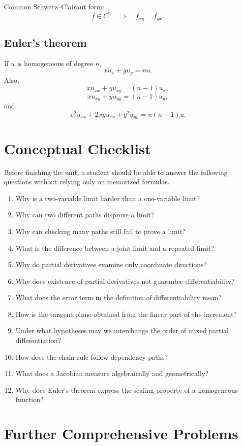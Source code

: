 \documentclass[11pt,oneside]{book}
\theoremstyle{studentthm}
\theoremstyle{definition}
\begin{document}
Common Schwarz--Clairaut form:
\[
f\in C^2
\quad\Longrightarrow\quad
f_{xy}=f_{yx}.
\]

\subsection*{Euler's theorem}
If \(u\) is homogeneous of degree \(n\),
\[
xu_x+yu_y=nu.
\]
Also,
\[
xu_{xx}+yu_{xy}=(n-1)u_x,
\]
\[
xu_{xy}+yu_{yy}=(n-1)u_y,
\]
and
\[
x^2u_{xx}+2xyu_{xy}+y^2u_{yy}=n(n-1)u.
\]


\section{Conceptual Checklist}

Before finishing the unit, a student should be able to answer the
following questions without relying only on memorized formulas.

\begin{enumerate}
\item Why is a two-variable limit harder than a one-variable limit?
\item Why can two different paths disprove a limit?
\item Why can checking many paths still fail to prove a limit?
\item What is the difference between a joint limit and a repeated
limit?
\item Why do partial derivatives examine only coordinate directions?
\item Why does existence of partial derivatives not guarantee
differentiability?
\item What does the error term in the definition of differentiability
mean?
\item How is the tangent plane obtained from the linear part of the
increment?
\item Under what hypotheses may we interchange the order of mixed
partial differentiation?
\item How does the chain rule follow dependency paths?
\item What does a Jacobian measure algebraically and geometrically?
\item Why does Euler's theorem express the scaling property of a
homogeneous function?
\end{enumerate}

\section{Further Comprehensive Problems}
\end{document}
